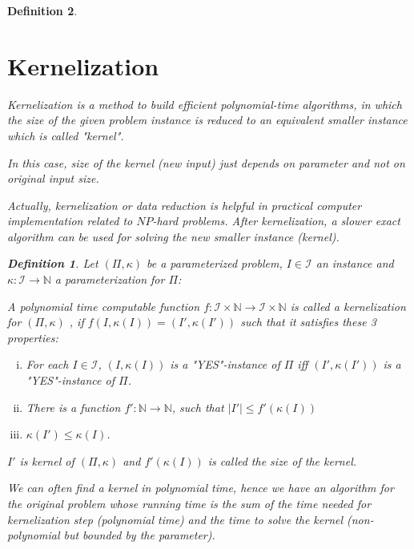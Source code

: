 \documentclass[12pt]{article}
\theoremstyle{slplain}
\newtheorem{defi}{Definition}
\begin{document}
\begin{defi}
\newpage

\section{Kernelization}

Kernelization is a method to build efficient polynomial-time algorithms, 
in which the size of the given problem instance is reduced to an equivalent smaller instance which is called "kernel". 

In this case, size of the kernel (new input) just depends on parameter and not on original input size. 

Actually, kernelization or data reduction is helpful in practical computer implementation related to $NP$-hard problems. After kernelization, a slower exact algorithm can be used for solving the new smaller instance (kernel).

\begin{defi}
Let $(\Pi, \kappa)$ be a parameterized problem, $I\in\mathcal{I}$ an instance and $\kappa: \mathcal{I} \to \mathbb{N}$ a parameterization for $\Pi$:

A polynomial time computable function $f : \mathcal{I} \times \mathbb{N} \to \mathcal{I} \times \mathbb{N}$ is called a
kernelization for $(\Pi, \kappa)$ , if $f(I, \kappa(I)) = (I', \kappa(I'))$ such that it satisfies these 3 properties:

\begin{enumerate}[(i)]
\item For each $I \in \mathcal{I}$, $(I, \kappa(I))$ is a "YES"-instance of $\Pi$ iff $(I', \kappa(I'))$ is a "YES"-instance of $\Pi$.

\item There is a function $f': \mathbb{N} \to \mathbb{N}$, such that $|I'| \leq f'(\kappa(I))$

\item $\kappa(I')\leq \kappa(I)$.
\end{enumerate}

$I'$ is kernel of $(\Pi, \kappa)$ and $f'(\kappa(I))$ is called the size of the kernel.

\end{defi}




We can often find a kernel in polynomial time, hence we have an algorithm for the original problem whose running time is the sum of the time needed for kernelization step (polynomial time) and the time to solve the kernel (non-polynomial but bounded by the parameter).


\end{defi}
\end{document}
